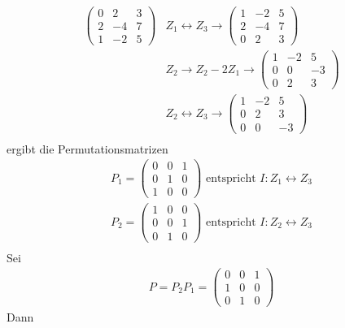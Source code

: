 \documentclass[11pt]{report}
\begin{document}
\begin{align}
\begin{pmatrix} 0 & 2 & 3 \\ 2 & -4 & 7 \\ 1 & -2 & 5 \end{pmatrix} &Z_1 \leftrightarrow Z_3 \longrightarrow \begin{pmatrix} 1 & -2 & 5 \\ 2 & -4 & 7 \\ 0 & 2 & 3 \end{pmatrix} \\
&Z_2 \rightarrow Z_2 - 2Z_1 \longrightarrow \begin{pmatrix} 1 & -2 & 5 \\ 0 & 0 & -3 \\ 0 & 2 & 3 \end{pmatrix} \\
&Z_2 \leftrightarrow Z_3 \longrightarrow \begin{pmatrix} 1 & -2 & 5 \\ 0 & 2 & 3 \\ 0 & 0 & -3 \end{pmatrix} \\
\end{align}
ergibt die Permutationsmatrizen
\begin{align}
P_1 = \begin{pmatrix} 0 & 0 & 1 \\ 0 & 1 & 0 \\ 1 & 0 & 0 \end{pmatrix} \text{ entspricht } I: Z_1 \leftrightarrow Z_3 \\
P_2 = \begin{pmatrix} 1 & 0 & 0 \\ 0 & 0 & 1 \\ 0 & 1 & 0 \end{pmatrix} \text{ entspricht } I: Z_2 \leftrightarrow Z_3 \\
\end{align}
Sei
\begin{align}
P = P_2 P_1 = \begin{pmatrix} 0 & 0 & 1 \\ 1 & 0 & 0 \\ 0 & 1 & 0 \end{pmatrix}
\end{align}
Dann
\end{document}
